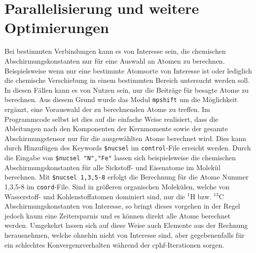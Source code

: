 \section{Parallelisierung und weitere Optimierungen}\label{paraopt}
Bei bestimmten Verbindungen kann es von Interesse sein, die chemischen Abschirmungskonstanten nur für eine Auswahl an Atomen zu berechnen. Beispielsweise wenn nur eine bestimmte Atomsorte von Interesse ist oder lediglich die chemische Verschiebung in einem bestimmten Bereich untersucht werden soll. In diesen Fällen kann es von Nutzen sein, nur die Beiträge für besagte Atome zu berechnen. Aus diesem Grund wurde das Modul \texttt{mpshift} um die Möglichkeit ergänzt, eine Vorauswahl der zu berechnenden Atome zu treffen. Im Programmcode selbst ist dies auf die einfache Weise realisiert, dass die Ableitungen nach den Komponenten der Kernmomente sowie der gesamte Abschirmungstensor nur für die ausgewählten Atome berechnet wird. Dies kann durch Hinzufügen des Keywords \texttt{\$nucsel} im \texttt{control}-File erreicht werden. Durch die Eingabe von \texttt{\$nucsel "N","Fe"} lassen sich beispielsweise die chemischen Abschirmungskonstanten für alle Sickstoff- und Eisenatome im Molekül berechnen. Mit \texttt{\$nucsel 1,3,5-8} erfolgt die Berechnung für die Atome Nummer 1,3,5-8 im \texttt{coord}-File. Sind in größeren organischen Molekülen, welche von Wasserstoff- und Kohlenstoffatomen dominiert sind, nur die $^1$H bzw. $^13$C Abschirmungskonstanten von Interesse, so bringt dieses vorgehen in der Regel jedoch kaum eine Zeitersparnis und es können direkt alle Atome berechnet werden. Umgekehrt lassen sich auf diese Weise auch Elemente aus der Rechnung herausnehmen, welche ohnehin nicht von Interesse sind, aber gegebenenfalls für ein schlechtes Konvergenzverhalten während der \ac{cphf}-Iterationen sorgen.


